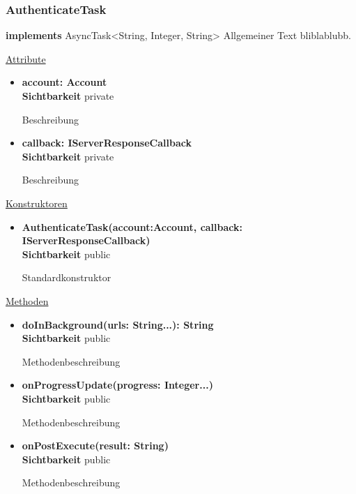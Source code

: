 \subsubsection{AuthenticateTask}
\textbf{implements} AsyncTask<String, Integer, String> \newline
Allgemeiner Text bliblablubb. \newline

\underline{Attribute}
\begin{itemize}
\itemsep0pt
\item \textbf{account: Account} \hfill\\ 
\textbf{Sichtbarkeit} private

Beschreibung

\item \textbf{callback: IServerResponseCallback} \hfill\\ 
\textbf{Sichtbarkeit} private

Beschreibung
\end{itemize}

\underline{Konstruktoren}
\begin{itemize}
\itemsep0pt
\item \textbf{AuthenticateTask(account:Account, callback: IServerResponseCallback)} \hfill\\
\textbf{Sichtbarkeit} public

Standardkonstruktor
\end{itemize}

\underline{Methoden}
\begin{itemize}
\itemsep0pt
\item \textbf{doInBackground(urls: String...): String}\hfill\\
\textbf{Sichtbarkeit} public

Methodenbeschreibung

\item \textbf{onProgressUpdate(progress: Integer...)}\hfill\\
\textbf{Sichtbarkeit} public

Methodenbeschreibung

\item \textbf{onPostExecute(result: String)}\hfill\\
\textbf{Sichtbarkeit} public

Methodenbeschreibung
\end{itemize}